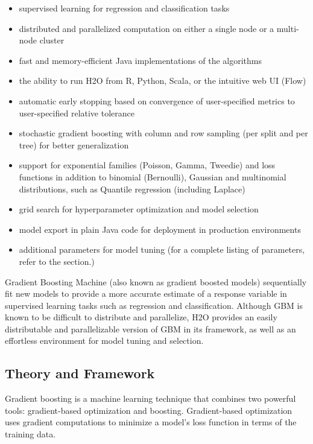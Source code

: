 \begin{itemize}
\item supervised learning for regression and classification tasks
\item distributed and parallelized computation on either a single node or a multi-node cluster
\item fast and memory-efficient Java implementations of the algorithms
\item the ability to run H2O from R, Python, Scala, or the intuitive web UI (Flow)
\item automatic early stopping based on convergence of user-specified metrics to user-specified relative tolerance
\item stochastic gradient boosting with column and row sampling (per split and per tree) for better generalization
\item support for exponential families (Poisson, Gamma, Tweedie) and loss functions in addition to binomial (Bernoulli), Gaussian and multinomial distributions, such as Quantile regression (including Laplace)
\item grid search for hyperparameter optimization and model selection
\item model export in plain Java code for deployment in production environments
\item additional parameters for model tuning (for a complete listing of parameters, refer to the {\textbf{}} section.)
\end{itemize}


Gradient Boosting Machine (also known as gradient boosted models) sequentially fit new models to provide a more accurate estimate of a response variable in supervised learning tasks such as regression and classification. Although GBM is known to be difficult to distribute and parallelize, H2O provides an easily distributable and parallelizable version of GBM in its framework, as well as an effortless environment for model tuning and selection.


\subsection{Theory and Framework}

Gradient boosting is a machine learning technique that combines two powerful tools: gradient-based optimization and
boosting. Gradient-based optimization uses gradient computations to minimize a model's loss function in terms of
the training data. 

